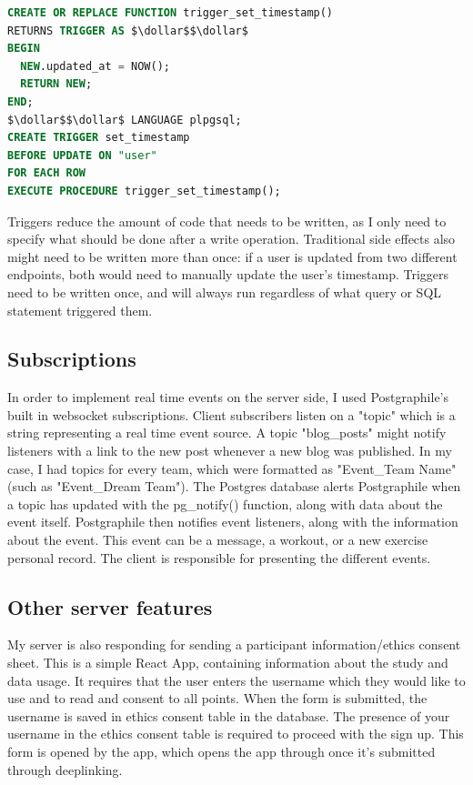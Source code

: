 \documentclass{l4proj}
\begin{document}
\begin{lstlisting}[language=SQL, caption={Definition of a trigger function which sets the rows' "updated\_at" column to be the current time, and a trigger which calls the function on a user whenever the user is updated.}]
CREATE OR REPLACE FUNCTION trigger_set_timestamp()
RETURNS TRIGGER AS $\dollar$$\dollar$ 
BEGIN
  NEW.updated_at = NOW();
  RETURN NEW;
END;
$\dollar$$\dollar$ LANGUAGE plpgsql;
CREATE TRIGGER set_timestamp
BEFORE UPDATE ON "user"
FOR EACH ROW
EXECUTE PROCEDURE trigger_set_timestamp();
\end{lstlisting}

Triggers reduce the amount of code that needs to be written, as I only need to specify what should be done after a write operation. Traditional side effects also might need to be written more than once: if a user is updated from two different endpoints, both would need to manually update the user's timestamp. Triggers need to be written once, and will always run regardless of what query or SQL statement triggered them.

\subsection{Subscriptions}
In order to implement real time events on the server side, I used Postgraphile's built in websocket subscriptions. Client subscribers listen on a "topic" which is a string representing a real time event source. A topic "blog\_posts" might notify listeners with a link to the new post whenever a new blog was published. In my case, I had topics for every team, which were formatted as "Event\_{Team Name}" (such as "Event\_Dream Team"). The Postgres database alerts Postgraphile when a topic has updated with the pg\_notify() function, along with data about the event itself. Postgraphile then notifies event listeners, along with the information about the event. This event can be a message, a workout, or a new exercise personal record. The client is responsible for presenting the different events. 

\subsection{Other server features}
My server is also responding for sending a participant information/ethics consent sheet. This is a simple React App, containing information about the study and data usage. It requires that the user enters the username which they would like to use and to read and consent to all points. When the form is submitted, the username is saved in ethics consent table in the database. The presence of your username in the ethics consent table is required to proceed with the sign up. This form is opened by the app, which opens the app through once it's submitted through deeplinking. 
\end{document}
